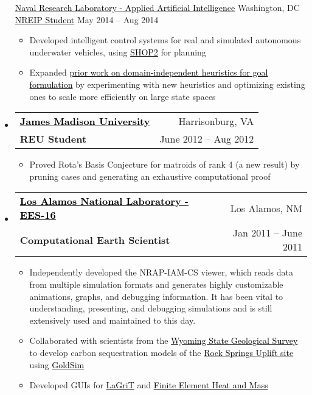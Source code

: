 \documentclass[letterpaper,12pt]{article}
\makeatletter
\newcommand{\link}[2]{\href{#1}{\textcolor{black}{#2}}}
\newcommand{\resitem}[1]{\item #1 \vspace{-2pt}}
\newcommand{\ressubheading}[4]{
	\begin{tabular*}{6.5in}{l@{\extracolsep{\fill}}r}
			\textbf{#1} & #2 \\
			\textbf{#3} & #4 \\
	\end{tabular*}\vspace{-6pt}
}
\makeatother
\begin{document}
\begin{itemize}
            {\link{http://www.nrl.navy.mil/}{Naval Research Laboratory - Applied Artificial Intelligence}}
            {Washington, DC}
            {\link{http://nreip.asee.org/}{NREIP Student}}
            {May 2014 -- Aug 2014}
				\begin{itemize}
                    \resitem{Developed intelligent control systems for real and simulated autonomous underwater vehicles, using \link{http://www.cs.umd.edu/projects/shop/}{SHOP2} for planning}
                    \resitem{Expanded \link{http://www.nrl.navy.mil/itd/aic/sites/www.nrl.navy.mil.itd.aic/files/pdfs/aha-FLAIRS2013-hueristics.pdf}{prior work on domain-independent heuristics for goal formulation} by experimenting with new heuristics and optimizing existing ones to scale more efficiently on large state spaces}
                \end{itemize}
		\item \ressubheading
            {\link{http://educ.jmu.edu/~vanwykla/reu/}{James Madison University}}
            {Harrisonburg, VA}
            {REU Student}
            {June 2012 -- Aug 2012}
				\begin{itemize}
					\resitem{Proved Rota's Basis Conjecture for matroids of rank 4 (a new result) by pruning cases and generating an exhaustive computational proof}
                \end{itemize}
		\item \ressubheading
            {\link{http://www.lanl.gov}{Los Alamos National Laboratory - EES-16}}
            {Los Alamos, NM}
            {Computational Earth Scientist}
            {Jan 2011 -- June 2011}
				\begin{itemize}
					\resitem{Independently developed the NRAP-IAM-CS viewer, which reads data from multiple simulation formats and generates highly customizable animations, graphs, and debugging information. It has been vital to understanding, presenting, and debugging simulations and is still extensively used and maintained to this day.}
					\resitem{Collaborated with scientists from the \link{http://www.wsgs.uwyo.edu/}{Wyoming State Geological Survey} to develop carbon sequestration models of the \link{http://www.wsgs.uwyo.edu/research/stratigraphy/RockSpringsUplift/Default.aspx}{Rock Springs Uplift site} using \link{http://www.goldsim.com/Home/}{GoldSim}}
					\resitem{Developed GUIs for \link{https://lagrit.lanl.gov/}{LaGriT} and \link{http://fehm.lanl.gov/}{Finite Element Heat and Mass}}
				\end{itemize}
	\end{itemize}
\pagebreak
\end{document}
